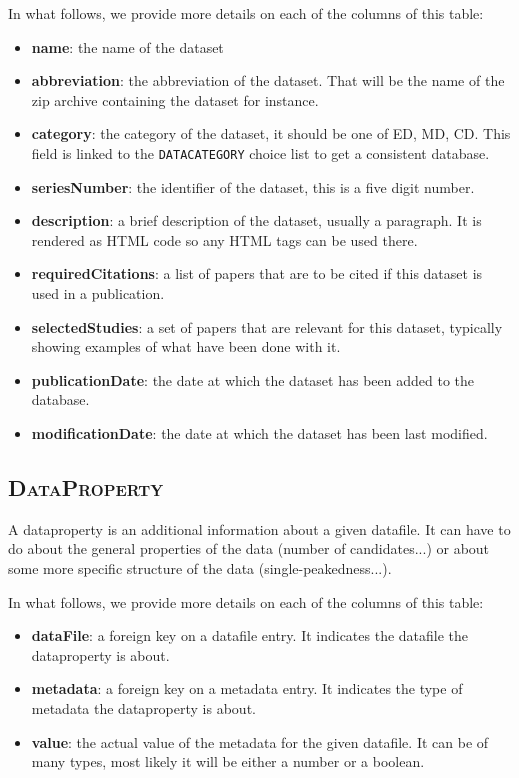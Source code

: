 \documentclass{report}
\begin{document}
	In what follows, we provide more details on each of the columns of this table:
	\begin{itemize}
		\item \textbf{name}: the name of the dataset
		\item \textbf{abbreviation}: the abbreviation of the dataset. That will be the name of the zip archive containing the dataset for instance.
		\item \textbf{category}: the category of the dataset, it should be one of ED, MD, CD. This field is linked to the \texttt{DATACATEGORY} choice list to get a consistent database.
		\item \textbf{seriesNumber}: the identifier of the dataset, this is a five digit number.
		\item \textbf{description}: a brief description of the dataset, usually a paragraph. It is rendered as HTML code so any HTML tags can be used there.
		\item \textbf{requiredCitations}: a list of papers that are to be cited if this dataset is used in a publication.
		\item \textbf{selectedStudies}: a set of papers that are relevant for this dataset, typically showing examples of what have been done with it.
		\item \textbf{publicationDate}: the date at which the dataset has been added to the database.
		\item \textbf{modificationDate}: the date at which the dataset has been last modified.
	\end{itemize}
	
	\subsection*{\faDatabase{} \textsc{DataProperty}}
	
	A dataproperty is an additional information about a given datafile. It can have to do about the general properties of the data (number of candidates...) or about some more specific structure of the data (single-peakedness...).
	
	In what follows, we provide more details on each of the columns of this table:
	\begin{itemize}
		\item \textbf{dataFile}: a foreign key on a datafile entry. It indicates the datafile the dataproperty is about.
		\item \textbf{metadata}: a foreign key on a metadata entry. It indicates the type of metadata the dataproperty is about.
		\item \textbf{value}: the actual value of the metadata for the given datafile. It can be of many types, most likely it will be either a number or a boolean.
	\end{itemize}
\end{document}
